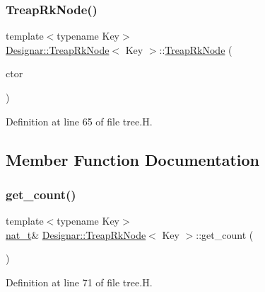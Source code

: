 \subsubsection{\texorpdfstring{Treap\+Rk\+Node()}{TreapRkNode()}\hspace{0.1cm}{\footnotesize\ttfamily [4/4]}}
{\footnotesize\ttfamily template$<$typename Key$>$ \\
\hyperlink{class_designar_1_1_treap_rk_node}{Designar\+::\+Treap\+Rk\+Node}$<$ Key $>$\+::\hyperlink{class_designar_1_1_treap_rk_node}{Treap\+Rk\+Node} (\begin{DoxyParamCaption}\item[{\hyperlink{namespace_designar_a679bc99fd69a3601faa5d6d47f865106}{Bin\+Tree\+Node\+Ctor}}]{ctor }\end{DoxyParamCaption})\hspace{0.3cm}{\ttfamily [inline]}}



Definition at line 65 of file tree.\+H.



\subsection{Member Function Documentation}
\mbox{\label{class_designar_1_1_treap_rk_node_a4396d6cb73dc8df8cdae3a94565995ef}} 
\subsubsection{\texorpdfstring{get\+\_\+count()}{get\_count()}}
{\footnotesize\ttfamily template$<$typename Key$>$ \\
\hyperlink{namespace_designar_aa72662848b9f4815e7bf31a7cf3e33d1}{nat\+\_\+t}\& \hyperlink{class_designar_1_1_treap_rk_node}{Designar\+::\+Treap\+Rk\+Node}$<$ Key $>$\+::get\+\_\+count (\begin{DoxyParamCaption}{ }\end{DoxyParamCaption})\hspace{0.3cm}{\ttfamily [inline]}}



Definition at line 71 of file tree.\+H.

\mbox{\label{class_designar_1_1_treap_rk_node_add770a59cfec151c17ac9f665d3ceb2f}} 
